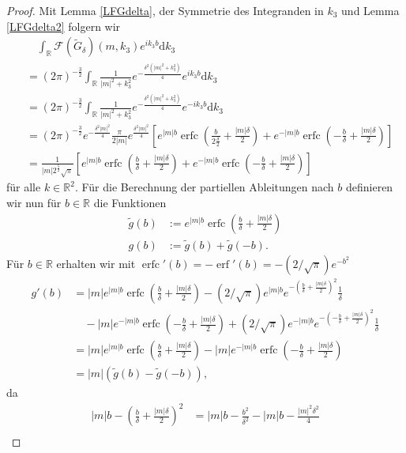 \documentclass[12pt,a4paper]{scrartcl}
\newcommand{\dd}{\mathrm{d}}
\numberwithin{equation}{section}
\newcommand{\R}{\mathbb{R}} %
\newcommand{\F}{\mathcal{F}} %
\newcommand{\erf}{\operatorname{erf}}
\newcommand{\erfc}{\operatorname{erfc}}
\begin{document}
\begin{proof}
Mit Lemma \ref{LFGdelta}, der Symmetrie des Integranden in $k_3$ und Lemma \ref{LFGdelta2} folgern wir
\begin{align*}
&\quad \int_\R  \F \left(\widetilde{G}_\delta\right)(m,k_3) e^{i k_3 b} \dd  k_3 \\
&=(2 \pi)^{-\frac{3}{2}} \int_\R \frac{1}{|m|^2+k_3^2}e^{-\frac{\delta^2(|m|^2 + k_3^2)}{4}} e^{i k_3 b} \dd k_3 \\
&=(2 \pi)^{-\frac{3}{2}} \int_\R \frac{1}{|m|^2+k_3^2}e^{-\frac{\delta^2(|m|^2 + k_3^2)}{4}} e^{-i k_3 b} \dd k_3 \\
&= (2 \pi)^{-\frac{3}{2}} e^{-\frac{\delta^2 |m|^2}{4}} \frac{\pi}{2 |m|} e^{\frac{\delta^2 |m|^2}{4}}
\left[
e^{|m|b} \erfc \left(\frac{b}{2 \frac{\delta}{2}}+ \frac{ |m|\delta}{2}\right) + e^{-|m| b} \erfc \left( - \frac{b}{\delta}+ \frac{|m| \delta}{2} \right) 
\right]\\
&=\frac{1}{|m| 2^{\frac{5}{2}}\sqrt{\pi}}
\left[
e^{|m|b} \erfc \left(\frac{b}{\delta}+ \frac{ |m|\delta}{2}\right) + e^{-|m| b} \erfc \left( - \frac{b}{\delta}+ \frac{|m| \delta}{2} \right) 
\right]
\end{align*}
für alle $k \in \R^2$.
Für die Berechnung der partiellen Ableitungen nach $b$ definieren wir nun für $b \in \R$ die Funktionen 
\begin{align*}
\tilde g(b)&:= e^{|m|b} \erfc \left(\frac{b}{\delta}+ \frac{ |m|\delta}{2}\right) \\
g(b)&:=\tilde g (b) + \tilde g(-b).
\end{align*}
Für $b \in \R$ erhalten wir mit $\erfc'(b)=-\erf'(b)=-(2/\sqrt{\pi})e^{-b^2}$
\begin{align*}
g'(b)&= |m| e^{|m|b} \erfc \left(\frac{b}{\delta}+ \frac{ |m|\delta}{2}\right) 
-(2/\sqrt{\pi}) e^{|m|b} e^{- \left(\frac{b}{\delta}+ \frac{ |m|\delta}{2}\right)^2}  \frac{1}{\delta} \\
& \quad -|m| e^{-|m| b} \erfc \left( - \frac{b}{\delta}+ \frac{|m| \delta}{2} \right) 
+(2/\sqrt{\pi}) e^{-|m| b} e^{- \left( - \frac{b}{\delta}+ \frac{|m| \delta}{2} \right)^2} \frac{1}{\delta} \\
&=|m| e^{|m|b} \erfc \left(\frac{b}{\delta}+ \frac{ |m|\delta}{2}\right) -|m| e^{-|m| b} \erfc \left( - \frac{b}{\delta}+ \frac{|m| \delta}{2} \right) \\
&=|m|( \tilde g(b) - \tilde g (-b)),
\end{align*}
da 
\begin{align*}
|m|b -\left(\frac{b}{\delta}+\frac{|m|\delta}{2}\right)^2 
&= |m|b - \frac{b^2}{\delta^2}- |m| b - \frac{|m|^2\delta^2}{4}  \\

\end{align*}
\end{proof}
\end{document}
